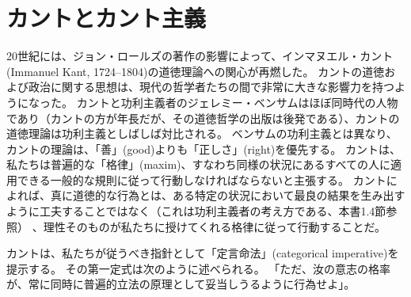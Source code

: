 \documentclass[paper=a4,book,openany]{jlreq}
\begin{document}
\section{カントとカント主義}

20世紀には、ジョン・ロールズの著作の影響によって、インマヌエル・カント(Immanuel Kant, 1724--1804)の道徳理論への関心が再燃した。
カントの道徳および政治に関する思想は、現代の哲学者たちの間で非常に大きな影響力を持つようになった。
カントと功利主義者のジェレミー・ベンサムはほぼ同時代の人物であり（カントの方が年長だが、その道徳哲学の出版は後発である）、カントの道徳理論は功利主義としばしば対比される。
ベンサムの功利主義とは異なり、カントの理論は、「善」(good)よりも「正しさ」(right)を優先する。
カントは、私たちは普遍的な「格律」(maxim)、すなわち同様の状況にあるすべての人に適用できる一般的な規則に従って行動しなければならないと主張する。
カントによれば、真に道徳的な行為とは、ある特定の状況において最良の結果を生み出すように工夫することではなく（これは功利主義者の考え方である、本書1.4節参照） 、理性そのものが私たちに授けてくれる格律に従って行動することだ。

カントは、私たちが従うべき指針として「定言命法」(categorical imperative)を提示する。
その第一定式は次のように述べられる。
「ただ、汝の意志の格率が、常に同時に普遍的立法の原理として妥当しうるように行為せよ」\citep[4:421, p.34]{kant11:_groun_metap_moral}。
\end{document}
